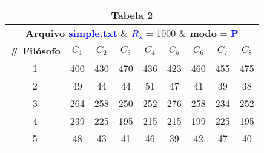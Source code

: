 \documentclass[11pt]{article}
\begin{document}
\begin{table}[!h]
	\begin{center}
		\begin{tabular}{| c | c | c | c | c | c | c | c | c |}
		\hline
		\multicolumn{9}{|c|}{\textbf{Tabela 2}} \\ \hline
		\multicolumn{9}{|c|}{\textbf{Arquivo \textcolor{blue}{simple.txt}} \& \textbf{\textcolor{blue}{$R_s$}} = 1000 \& \textbf{modo} = \textbf{\textcolor{blue}{P}}} \\
		\hline
			\textbf{\# Filósofo} & \textbf{$C_1$} & \textbf{$C_2$} & \textbf{$C_3$} & \textbf{$C_4$} & \textbf{$C_5$} & \textbf{$C_6$} & \textbf{$C_7$} & \textbf{$C_8$} \\ \hline
			1 & 400 & 430 & 470 & 436 & 423 & 460 & 455 & 475 \\ \hline
			2 & 49  & 44  & 44  & 51  & 47  & 41  & 39  & 38  \\ \hline
			3 & 264 & 258 & 250 & 252 & 276 & 258 & 234 & 252 \\ \hline
			4 & 239 & 225 & 195 & 215 & 215 & 199 & 225 & 195 \\ \hline
			5 & 48  & 43  & 41  & 46  & 39  & 42  & 47  & 40  \\ \hline
		\end{tabular}
	\end{center}
\end{table}
\end{document}
